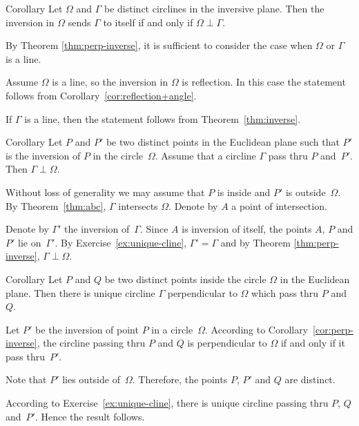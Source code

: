 \begin{thm}{Corollary}\label{cor:perp-inverse-clines}
Let $\Omega$  and $\Gamma$ be distinct circlines in the inversive plane.
Then
the inversion in $\Omega$ sends $\Gamma$ to itself if and only if $\Omega\perp\Gamma$.
\end{thm}

By Theorem \ref{thm:perp-inverse}, it is sufficient to consider the case when $\Omega$ or $\Gamma$ is a line.

Assume $\Omega$ is a line, so the inversion in $\Omega$ is reflection.
In this case the statement follows from Corollary~\ref{cor:reflection+angle}.

If $\Gamma$ is a line, 
then the statement follows from Theorem~\ref{thm:inverse}.
\qeds


\begin{thm}{Corollary}\label{cor:perp-inverse}
Let $P$ and $P'$ be two distinct points  in the Euclidean plane
such that $P'$ is the inversion of $P$ in the circle~$\Omega$.
Assume that a circline $\Gamma$ pass thru $P$ and~$P'$.
Then $\Gamma\perp\Omega$.
\end{thm}

Without loss of generality we may assume that $P$ is inside and $P'$ is outside~$\Omega$.
By Theorem~\ref{thm:abc}, $\Gamma$ intersects $\Omega$.
Denote by $A$ a point of intersection.


Denote by $\Gamma'$ the inversion of~$\Gamma$.
Since $A$ is inversion of itself, the points $A$, $P$ and $P'$ lie on~$\Gamma'$.
By Exercise~\ref{ex:unique-cline},
$\Gamma'=\Gamma$
and
by Theorem \ref{thm:perp-inverse}, $\Gamma\perp\Omega$.
\qeds

\begin{thm}{Corollary}\label{cor:h-line} Let $P$ and $Q$ be two distinct points inside the circle $\Omega$ in the Euclidean plane.
Then there is unique circline $\Gamma$ perpendicular to $\Omega$ which pass thru $P$ and~$Q$.  
\end{thm}

Let $P'$ be the inversion of point $P$ in a circle~$\Omega$.
According to Corollary~\ref{cor:perp-inverse},
the circline passing thru $P$ and $Q$ 
is perpendicular to $\Omega$ if and only if it pass thru~$P'$.

Note that $P'$ lies outside of~$\Omega$.
Therefore, the points $P$, $P'$ and $Q$ are distinct.

According to Exercise~\ref{ex:unique-cline},
there is unique circline passing thru $P$, $Q$ and~$P'$.
Hence the result follows.
\qeds

